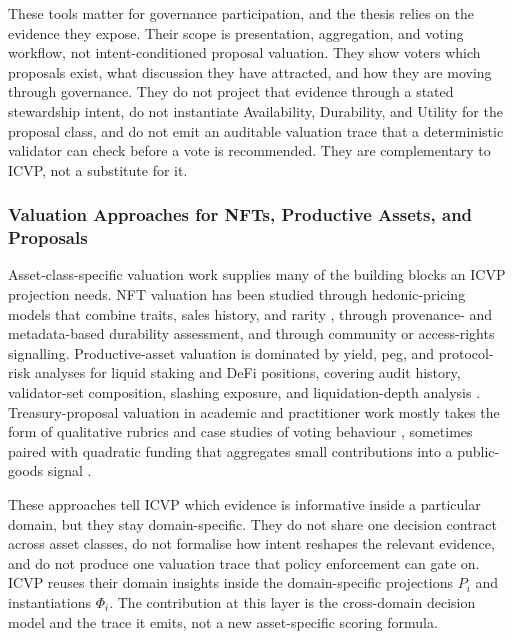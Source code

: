 These tools matter for governance participation, and the thesis relies on the
evidence they expose. Their scope is presentation, aggregation, and voting
workflow, not intent-conditioned proposal valuation. They show voters which
proposals exist, what discussion they have attracted, and how they are
moving through governance. They do not project that evidence through a
stated stewardship intent, do not instantiate Availability, Durability, and
Utility for the proposal class, and do not emit an auditable valuation
trace that a deterministic validator can check before a vote is recommended.
They are complementary to ICVP, not a substitute for it.

\subsubsection{Valuation Approaches for NFTs, Productive Assets, and Proposals}

Asset-class-specific valuation work supplies many of the building blocks an
ICVP projection needs. NFT valuation has been studied through hedonic-pricing
models that combine traits, sales history, and rarity
\cite{Lohmer2024, Ante2021, Dowling2022, Nadini2021, Kong2021}, through
provenance- and metadata-based durability assessment, and through community
or access-rights signalling. Productive-asset valuation is dominated by
yield, peg, and protocol-risk analyses for liquid staking and DeFi positions,
covering audit history, validator-set composition, slashing exposure, and
liquidation-depth analysis \cite{frangella2022aave, gambacorta2024defi}.
Treasury-proposal valuation in academic and practitioner work mostly takes
the form of qualitative rubrics and case studies of voting behaviour
\cite{Rodrigues2022, Valastin2024proto}, sometimes paired with quadratic
funding that aggregates small contributions into a public-goods signal
\cite{Buterin2018QF, Buterin2019, Pasquini2021, Weyl2018}.

These approaches tell ICVP which evidence is informative inside a particular
domain, but they stay domain-specific. They do not share one decision
contract across asset classes, do not formalise how intent reshapes the
relevant evidence, and do not produce one valuation trace that policy
enforcement can gate on. ICVP reuses their domain insights inside the
domain-specific projections $P_i$ and instantiations $\Phi_i$. The
contribution at this layer is the cross-domain decision model and the trace
it emits, not a new asset-specific scoring formula.

